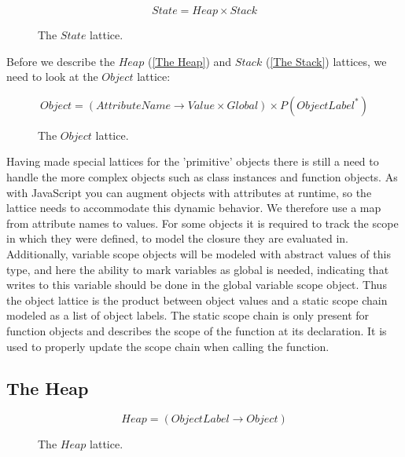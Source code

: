 \begin{figure}[H]
\begin{equation*}
State = Heap \times Stack
\end{equation*}
\vspace{-15pt}
\caption{The $State$ lattice.}
\label{lattice:State}
\end{figure}

Before we describe the $Heap$ (\autoref{The Heap}) and $Stack$ (\autoref{The Stack}) lattices, we need to look at the $Object$ lattice:

\begin{figure}[H]
\begin{equation*}
Object = (AttributeName \rightarrow Value \times Global) \times P(ObjectLabel^{*})
\end{equation*}
\vspace{-15pt}
\caption{The $Object$ lattice.}
\label{lattice:Object}
\end{figure}

Having made special lattices for the 'primitive' objects there is still a need to handle the more complex objects such as class instances and function objects. As with JavaScript you can augment objects with attributes at runtime, so the lattice needs to accommodate this dynamic behavior. We therefore use a map from attribute names to values. For some objects it is required to track the scope in which they were defined, to model the closure they are evaluated in. Additionally, variable scope objects will be modeled with abstract values of this type, and here the ability to mark variables as global is needed, indicating that writes to this variable should be done in the global variable scope object. Thus the object lattice is the product between object values and a static scope chain modeled as a list of object labels. The static scope chain is only present for function objects and describes the scope of the function at its declaration. It is used to properly update the scope chain when calling the function.

\subsection{The Heap}
\label{The Heap}

\begin{figure}[H]
\begin{equation*}
Heap = (ObjectLabel \rightarrow Object)
\end{equation*}
\vspace{-15pt}
\caption{The $Heap$ lattice.}
\label{lattice:Heap}
\end{figure}

